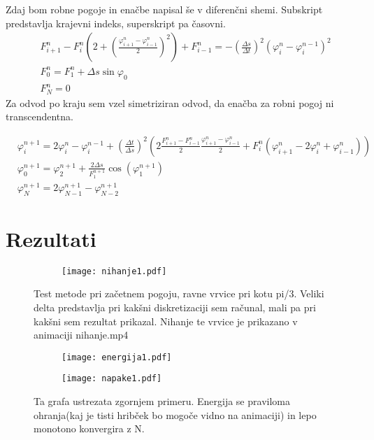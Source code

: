 \documentclass{article}
\begin{document}
Zdaj bom robne pogoje in enačbe napisal še v diferenčni shemi. Subskript predstavlja krajevni indeks, superskript pa časovni.
\begin{align*}
&F_{i+1}^n -F_i^n \left( 2 + \left(\frac{\varphi_{i+1}^n -\varphi_{i-1}^n}{2}\right)^2 \right) + F_{i-1}^n = - \left( \frac{\Delta s}{\Delta t}\right) ^2 \left( \varphi_i^n - \varphi_i^{n-1}\right)^2 \\
&F_0^n = F_1^n + \Delta s \sin \varphi_0 \\
&F_N^n = 0
\end{align*}
Za odvod po kraju sem vzel simetriziran odvod, da enačba za robni pogoj ni transcendentna.

\begin{align*}
&\varphi_i^{n+1} = 2 \varphi_i^n - \varphi_i^{n-1} + \left(\frac{\Delta t}{\Delta s} \right)^2 \left( 2 \frac{F_{i+1}^n - F_{i-1}^n}{2} \frac{\varphi_{i+1}^n - \varphi_{i-1}^n}{2} + F_i^n ( \varphi_{i+1}^n - 2 \varphi_i^n + \varphi_{i-1}^n ) \right) \\
&\varphi_0^{n+1} = \varphi_2^{n+1} + \frac{2 \Delta s}{F_1^{n+1}} \cos(\varphi_1^{n+1}) \\
&\varphi_N^{n+1} = 2 \varphi_{N-1}^{n+1} - \varphi_{N-2}^{n+1}
\end{align*}


\section{Rezultati}
\begin{figure}[H]
\centering
\begin{subfigure}{\textwidth}
\texttt{[image: nihanje1.pdf]}
\end{subfigure}
\caption*{Test metode pri začetnem pogoju, ravne vrvice pri kotu pi/3. Veliki delta predstavlja pri kakšni diskretizaciji sem računal, mali pa pri kakšni sem rezultat prikazal. Nihanje te vrvice je prikazano v animaciji nihanje.mp4}
\end{figure}

\begin{figure}[H]
\centering
\begin{subfigure}{.49\textwidth}
\texttt{[image: energija1.pdf]}
\end{subfigure}
\begin{subfigure}{.49\textwidth}
\texttt{[image: napake1.pdf]}
\end{subfigure}
\caption*{Ta grafa ustrezata zgornjem primeru. Energija se praviloma ohranja(kaj je tisti hribček bo mogoče vidno na animaciji) in lepo monotono konvergira z N.}
\end{figure}
\end{document}
